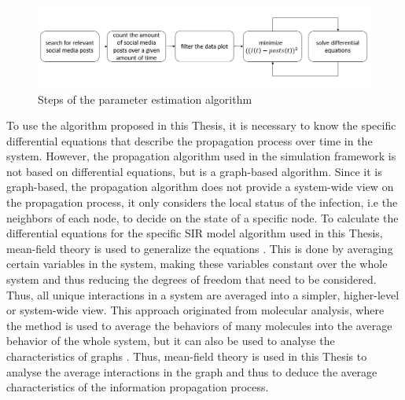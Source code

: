 \begin{figure}[!ht]
    \center
    \includegraphics[scale=.65]{figs/parameter_estimation_process.png}
    \caption{Steps of the parameter estimation algorithm}
    \label{paramestimationbasic}
\end{figure}

To use the algorithm proposed in this Thesis, it is necessary to 
know the specific differential equations that describe the propagation 
process over time in the system. However, the propagation algorithm
used in the simulation framework is not based on differential equations,
but is a graph-based algorithm. Since it is graph-based, the propagation algorithm
does not provide a system-wide view on the propagation process,
it only considers the local status of the infection, i.e the neighbors
of each node, to decide on the state of a specific node.
To calculate the differential equations for the specific SIR model algorithm
used in this Thesis, mean-field theory is used to generalize the equations
\cite{chaikin1995principles}.
This is done by averaging certain variables in the system, making these
variables constant over the whole system and thus 
reducing the degrees of freedom that need to be considered.
Thus, all unique interactions in a system are averaged into a simpler,
higher-level or system-wide view.
This approach originated from molecular analysis, where the method is used
to average the behaviors of many molecules into the average behavior
of the whole system,
but it can also be used to analyse the characteristics of graphs
\cite{barabasi1999mean}\cite{sirsmodel}.
Thus, mean-field theory is used in this Thesis to 
analyse the average interactions in the graph and thus to deduce 
the average characteristics of the information 
propagation process. 

